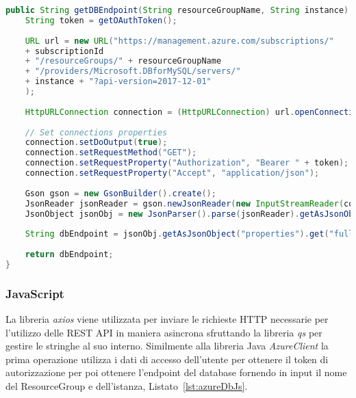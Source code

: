\begin{lstlisting}[language=Java,caption={Codice Java appartenente alla libreria AzureClient per l'ottenimento dell'endpoint del database.}, label={lst:azureDbJava}]
public String getDBEndpoint(String resourceGroupName, String instance) throws IOException {
    String token = getOAuthToken();
    
    URL url = new URL("https://management.azure.com/subscriptions/" 
    + subscriptionId
    + "/resourceGroups/" + resourceGroupName 
    + "/providers/Microsoft.DBforMySQL/servers/" 
    + instance + "?api-version=2017-12-01"
    );
    
    HttpURLConnection connection = (HttpURLConnection) url.openConnection();	
    
    // Set connections properties
    connection.setDoOutput(true);
    connection.setRequestMethod("GET");
    connection.setRequestProperty("Authorization", "Bearer " + token);
    connection.setRequestProperty("Accept", "application/json");
    
    Gson gson = new GsonBuilder().create();
    JsonReader jsonReader = gson.newJsonReader(new InputStreamReader(connection.getInputStream()));
    JsonObject jsonObj = new JsonParser().parse(jsonReader).getAsJsonObject();
    
    String dbEndpoint = jsonObj.getAsJsonObject("properties").get("fullyQualifiedDomainName").getAsString();
    
    return dbEndpoint;
}
\end{lstlisting}

\subsubsection{JavaScript}
La libreria \textit{axios} \cite{axios} viene utilizzata per inviare le richieste HTTP necessarie per l'utilizzo delle REST API in maniera asincrona sfruttando la libreria \textit{qs} \cite{qs} per gestire le stringhe al suo interno. Similmente alla libreria Java \textit{AzureClient} la prima operazione utilizza i dati di accesso dell'utente per ottenere il token di autorizzazione per poi ottenere l'endpoint del database fornendo in input il nome del ResourceGroup e dell'istanza, Listato~\ref{lst:azureDbJs}.\\

